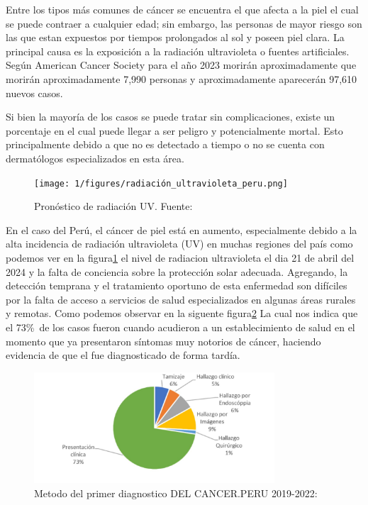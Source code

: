 Entre los tipos más comunes de cáncer se encuentra el que afecta a la piel el cual se puede contraer a cualquier edad; sin embargo, las personas de mayor riesgo son las que estan expuestos por tiempos prolongados al sol y poseen piel clara. La principal causa es la exposición a la radiación ultravioleta o fuentes artificiales. Según American Cancer Society para el año 2023 morirán aproximadamente que morirán aproximadamente 7,990 personas y aproximadamente aparecerán 97,610 nuevos casos.

Si bien la mayoría de los casos se puede tratar sin complicaciones, existe un porcentaje en el cual puede llegar a ser peligro y potencialmente mortal. Esto principalmente debido a que no es detectado a tiempo o no se cuenta con dermatólogos especializados en esta área.

\begin{figure}[h]
	\begin{center}
		\texttt{[image: 1/figures/radiación\_ultravioleta\_peru.png]}
		\caption{Pronóstico de radiación UV. Fuente: \cite{SENAMHI_uv}}
		\label{1:fig1}
	\end{center}
\end{figure}



En el caso del Perú, el cáncer de piel está en aumento, especialmente debido a la alta incidencia de radiación ultravioleta (UV) en muchas regiones del país como podemos ver en la figura\ref{1:fig1} el nivel de radiacion ultravioleta el dia 21 de abril del 2024 \parencite{SENAMHI_uv}  y la falta de conciencia sobre la protección solar adecuada. Agregando, la detección temprana y el tratamiento oportuno de esta enfermedad son difíciles por la falta de acceso a servicios de salud especializados en algunas áreas rurales y remotas. Como podemos observar en la siguente figura\ref{1:fig2} La cual nos indica que el 73\%\ de los casos fueron cuando acudieron a un establecimiento de salud en el momento que ya presentaron síntomas muy notorios de cáncer, haciendo evidencia de que el fue diagnosticado de forma tardía. \parencite{cancer_diagnostico}



\begin{figure}[h]
	\begin{center}
		\includegraphics[width=0.8\textwidth]{1/figures/cancer_diagnostico.JPG}
		\caption{Metodo del primer diagnostico DEL CANCER.PERU 2019-2022: \cite{cancer_diagnostico}}
		\label{1:fig2}
	\end{center}
\end{figure}


